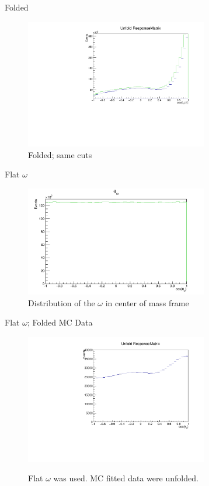 \documentclass[
		10pt
		]{beamer}
\begin{document}
\begin{frame}{Folded}
	\begin{figure}
		\includegraphics[width=8cm]{Plots/WholeUnfold35.pdf}
		\captionsetup{labelformat=empty}
		\caption{Folded; same cuts}
	\end{figure}
\end{frame}

\begin{frame}{Flat $\omega$}
	\begin{figure}
		\includegraphics[width=8cm]{Plots/OmegaFlat.pdf}
		\captionsetup{labelformat=empty}
		\caption{Distribution of the $\omega$ in center of mass frame}
	\end{figure}
\end{frame}

\fi

\begin{frame}{Flat $\omega$; Folded MC Data}
	
	
	\begin{figure}
		
		
		
		\includegraphics[width=8cm]{Plots/FlatMC.pdf}\\
		\captionsetup{labelformat=empty}
		\caption{Flat $\omega$ was used. MC fitted data were unfolded.}
	\end{figure}
\end{frame}
\end{document}
